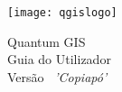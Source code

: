
\begin{titlepage}
\begin{center}

\begin{center}
\texttt{[image: qgislogo]} 
\end{center}

\Huge{Quantum GIS}\\
\vspace{0.5cm}
\Large{Guia do Utilizador} \\
\vspace{0.5cm}
\Large{Versão ~\CURRENT \textsl{'Copiapó'}}

\end{center}
\end{titlepage}
